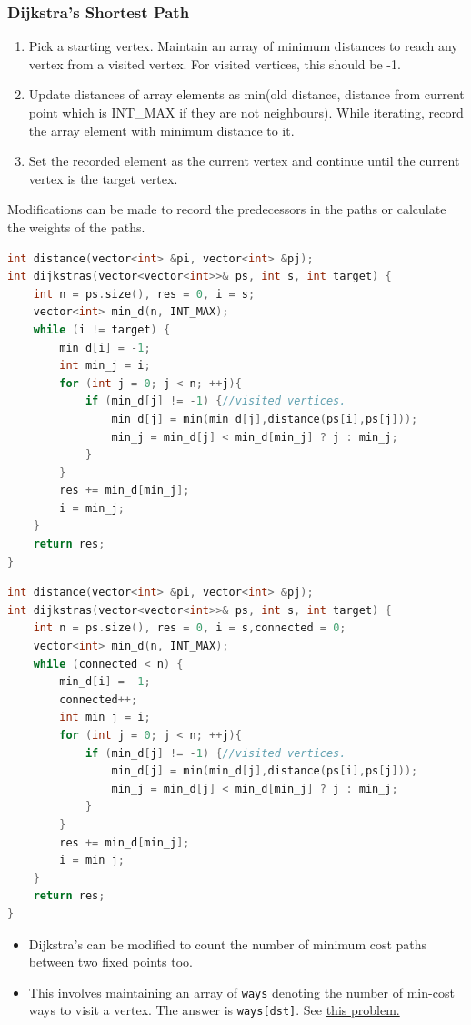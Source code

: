 \documentclass{report}
\begin{document}
\subsubsection*{Dijkstra's Shortest Path}
\begin{enumerate}
    \item Pick a starting vertex. Maintain an array of minimum distances to reach any vertex from a visited vertex. For visited vertices, this should be -1.
    \item Update distances of array elements as min(old distance, distance from current point which is INT\_MAX if they are not neighbours). While iterating, record the array element with minimum distance to it. 
    \item Set the recorded element as the current vertex and continue until the current vertex is the target vertex.
\end{enumerate}
Modifications can be made to record the predecessors in the paths
or calculate the weights of the paths.
\begin{lstlisting}[language=C++,caption=Shortest Path]
int distance(vector<int> &pi, vector<int> &pj);
int dijkstras(vector<vector<int>>& ps, int s, int target) {
    int n = ps.size(), res = 0, i = s;
    vector<int> min_d(n, INT_MAX);
    while (i != target) {
        min_d[i] = -1;
        int min_j = i;
        for (int j = 0; j < n; ++j){
            if (min_d[j] != -1) {//visited vertices.
                min_d[j] = min(min_d[j],distance(ps[i],ps[j]));
                min_j = min_d[j] < min_d[min_j] ? j : min_j;
            }
        }
        res += min_d[min_j];
        i = min_j;
    }
    return res;
}
\end{lstlisting}
\begin{lstlisting}[language=C++,caption=Dijkstra's MST]
int distance(vector<int> &pi, vector<int> &pj);
int dijkstras(vector<vector<int>>& ps, int s, int target) {
    int n = ps.size(), res = 0, i = s,connected = 0;
    vector<int> min_d(n, INT_MAX);
    while (connected < n) {
        min_d[i] = -1;
        connected++;
        int min_j = i;
        for (int j = 0; j < n; ++j){
            if (min_d[j] != -1) {//visited vertices.
                min_d[j] = min(min_d[j],distance(ps[i],ps[j]));
                min_j = min_d[j] < min_d[min_j] ? j : min_j;
            }
        }
        res += min_d[min_j];
        i = min_j;
    }
    return res;
}
\end{lstlisting}
\begin{itemize}
\item Dijkstra's can be modified to count the number of minimum cost paths between two fixed points too.
\item This involves maintaining an array of \texttt{ways} denoting the number of min-cost ways to visit a vertex. The answer is \texttt{ways[dst]}. See \href{https://leetcode.com/problems/number-of-ways-to-arrive-at-destination/}{this problem.}
\end{itemize}
\end{document}

